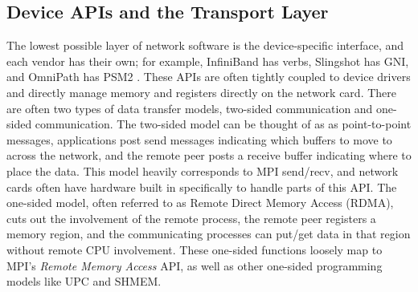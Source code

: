 \subsection{Device APIs and the Transport Layer}

The lowest possible layer of network software is the device-specific interface, and each vendor has their own; for example, InfiniBand has verbs, Slingshot has GNI, and OmniPath has PSM2 \cite{IBSpec,Slingshot,PSM2}.
These APIs are often tightly coupled to device drivers and directly manage memory and registers directly on the network card.
There are often two types of data transfer models, two-sided communication and one-sided communication.
The two-sided model can be thought of as as point-to-point messages, applications post send messages indicating which buffers to move to across the network, and the remote peer posts a receive buffer indicating where to place the data.
This model heavily corresponds to MPI send/recv, and network cards often have hardware built in specifically to handle parts of this API.  
The one-sided model, often referred to as Remote Direct Memory Access (RDMA), cuts out the involvement of the remote process, the remote peer registers a memory region, and the communicating processes can put/get data in that region without remote CPU involvement.
These one-sided functions loosely map to MPI's \textit{Remote Memory Access} API, as well as other one-sided programming models like UPC and SHMEM.

